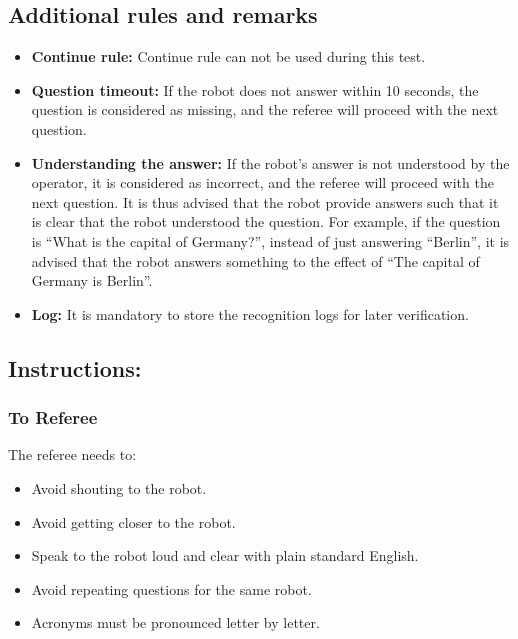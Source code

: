\subsection*{Additional rules and remarks}
\begin{itemize}[nosep]
	\item \textbf{Continue rule:} Continue rule can not be used during this test.
	\item \textbf{Question timeout:} If the robot does not answer within 10 seconds, the question is considered as missing, and the referee will proceed with the next question.
	\item \textbf{Understanding the answer:} If the robot's answer is not understood by the operator, it is considered as incorrect, and the referee will proceed with the next question. It is thus advised that the robot provide answers such that it is clear that the robot understood the question. For example, if the question is “What is the capital of Germany?”, instead of just answering “Berlin”, it is advised that the robot answers something to the effect of “The capital of Germany is Berlin”.
	\item \textbf{Log:} It is mandatory to store the recognition logs for later verification.
\end{itemize}

\subsection*{Instructions:}
\subsubsection*{To Referee}

The referee needs to:
\begin{itemize}
	\item Avoid shouting to the robot.
	\item Avoid getting closer to the robot.
	\item Speak to the robot loud and clear with plain standard English.
	\item Avoid repeating questions for the same robot. 
	\item Acronyms must be pronounced letter by letter.
\end{itemize}

